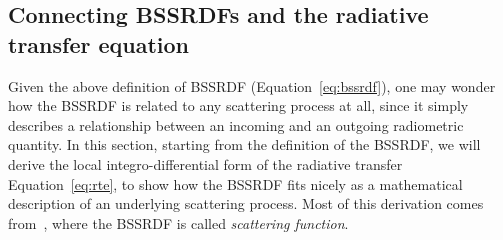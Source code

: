 \subsection{Connecting BSSRDFs and the radiative transfer equation}

Given the above definition of BSSRDF (Equation~\ref{eq:bssrdf}), one may wonder how the BSSRDF is related to any scattering process at all, since it simply describes a relationship between an incoming and an outgoing radiometric quantity. In this section, starting from the definition of the BSSRDF, we will derive the local integro-differential form of the radiative transfer Equation~\ref{eq:rte}, to show how the BSSRDF fits nicely as a mathematical description of an underlying scattering process. Most of this derivation comes from~\citet{Preisendorfer1965,Preisendorfer76}, where the BSSRDF is called \emph{scattering function}.

